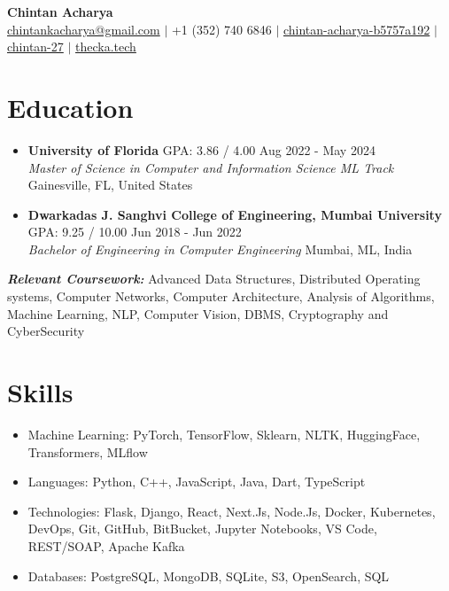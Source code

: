 \documentclass[a4paper,10pt]{article}
\begin{document}
\pagestyle{empty}

\begin{center}
    \textbf{\LARGE Chintan Acharya} \\
    \vspace{7pt} 
    \href{mailto:chintankacharya@gmail.com}{chintankacharya@gmail.com} $\vert$ +1 (352) 740 6846 $\vert$ \href{https://linkedin.com/in/chintan-acharya-b5757a192}{\faLinkedin  { } chintan-acharya-b5757a192} $\vert$ \href{https://github.com/chintan-27}{\faGithub { } chintan-27} $\vert$ \href{https://thecka.tech}{thecka.tech}

\end{center}

\vspace{-20pt}
\section*{Education}
\vspace{-5pt}

\begin{itemize}
    \item \textbf{University of Florida} GPA: 3.86 / 4.00  \hfill Aug 2022 - May 2024 \\
\textit{Master of Science in Computer and Information Science ML Track} \hfill Gainesville, FL, United States
\vspace{5pt}
\item \textbf{Dwarkadas J. Sanghvi College of Engineering, Mumbai University} GPA: 9.25 / 10.00  \hfill Jun 2018 - Jun 2022 \\
\textit{Bachelor of Engineering in Computer Engineering } \hfill Mumbai, ML, India
 \\
\end{itemize}
\vspace{-5pt}
    \textit{\textbf{Relevant Coursework:}} Advanced Data Structures, Distributed Operating systems, Computer Networks, Computer Architecture, Analysis of Algorithms, Machine Learning, NLP, Computer Vision, DBMS, Cryptography and CyberSecurity

\vspace{-10pt}
\section*{Skills}
\vspace{-5pt}
\begin{itemize}
   \item Machine Learning: PyTorch, TensorFlow, Sklearn, NLTK, HuggingFace, Transformers, MLflow  
\item Languages: Python, C++, JavaScript, Java, Dart, TypeScript  
\item Technologies: Flask, Django, React, Next.Js, Node.Js, Docker, Kubernetes, DevOps, Git, GitHub, BitBucket, Jupyter Notebooks, VS Code, REST/SOAP, Apache Kafka  
\item Databases: PostgreSQL, MongoDB, SQLite, S3, OpenSearch, SQL
\end{itemize}
\end{document}
